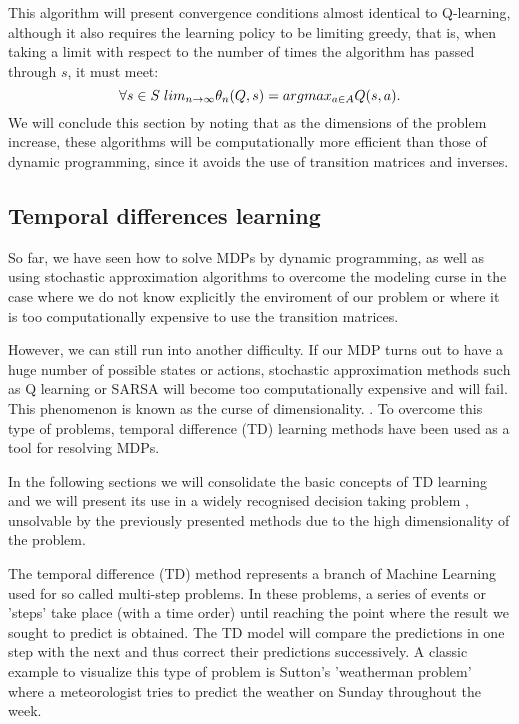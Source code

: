 \documentclass[12pt]{article}
\numberwithin{equation}{section}
\begin{document}
This algorithm will present convergence conditions almost identical to Q-learning, although it also requires the learning policy to  be limiting greedy, that is, when taking a limit with respect to the number of times the algorithm has passed through $s$, it must meet:
$$\forall s \in S \hspace{1mm} lim_{n\rightarrow \infty} \theta_n(Q,s)=argmax_{a \in A} Q(s,a).$$
We will conclude this section by noting that as the dimensions of the problem increase, these algorithms will be computationally more efficient than those of dynamic programming, since it avoids the use of transition matrices and  inverses.

\subsection{Temporal differences learning}


So far, we have seen how to solve MDPs by dynamic programming, as well as using stochastic approximation algorithms to overcome the modeling curse in the case where we do not know explicitly the enviroment of our problem or where it is too computationally expensive to use the transition matrices.





However, we can still run into another difficulty. If our MDP turns out to have a huge number of possible states or actions, stochastic approximation methods such as Q learning or SARSA will become too computationally expensive and will fail. This phenomenon is known as the curse of dimensionality. . To overcome this type of problems, temporal difference (TD) learning methods have been  used as a tool for resolving MDPs.



In the following sections we will consolidate the basic concepts of TD learning and we will present its use in a widely recognised  decision taking problem \cite{tesauro1994td}, unsolvable by the previously presented methods due to the high dimensionality of the problem.




The temporal difference (TD) method represents a branch of Machine Learning used for so called multi-step problems. In these problems, a series of events or 'steps' take place (with a time order) until reaching the point where the result we sought to predict is obtained. The TD model will compare the predictions in one step with the next and thus correct their predictions successively. A classic example to visualize this type of problem is Sutton's 'weatherman problem'  \cite{sutton1988learning}  where a meteorologist tries to predict the weather on Sunday throughout the week.
\end{document}
